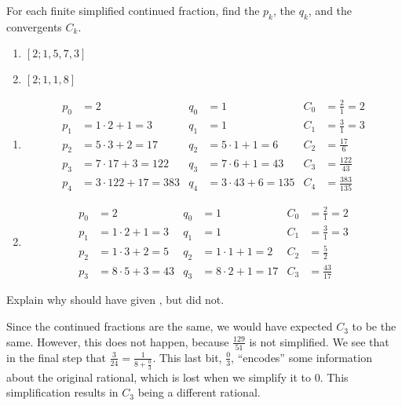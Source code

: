 \documentclass{article}
\newcommand{\quotewrap}[1]{“#1”}
\begin{document}
\begin{problem}{}{}
    \color{CtpText}
    For each finite simplified continued fraction, find the $p_k$, the $q_k$, and the convergents $C_k$.
    \begin{enumerate}[label=\textbf{\arabic*}.]
        \item $[2;1,5,7,3]$
        \item $[2;1,1,8]$
    \end{enumerate}
\end{problem}
\begin{solution}{}{}
    \color{CtpText}
    \begin{enumerate}[label=\textbf{\arabic*}.]
        \item
        \begin{align*}
        p_0&=2 & q_0&=1 & C_0&=\frac{2}{1}=2 \\
        p_1&=1\cdot2+1=3 & q_1&=1 & C_1&=\frac{3}{1}=3 \\
        p_2&=5\cdot3+2=17 & q_2&=5\cdot1+1=6 & C_2&=\frac{17}{6}\\
        p_3&=7\cdot17+3=122 & q_3&=7\cdot6+1=43 & C_3&=\frac{122}{43} \\
        p_4&=3\cdot122+17=383 & q_4&=3\cdot43+6=135 & C_4&=\frac{383}{135}
        \end{align*}
        \item
        \begin{align*}
            p_0&=2 & q_0&=1 & C_0&=\frac{2}{1}=2 \\
            p_1&=1\cdot2+1=3 & q_1&=1 & C_1&=\frac{3}{1}=3 \\
            p_2&=1\cdot3+2=5 & q_2&=1\cdot1+1=2 & C_2&=\frac{5}{2} \\
            p_3&=8\cdot5+3=43 & q_3&=8\cdot2+1=17 & C_3&=\frac{43}{17}
        \end{align*}
    \end{enumerate}
\end{solution}

\begin{problem}{}{}
    \color{CtpText}
    Explain why  should have given , but did not.
\end{problem}
\begin{solution}{}{}
    \color{CtpText}
    Since the continued fractions are the same, we would have expected $C_3$ to be the same. However, this does not happen, because $\frac{129}{51}$ is not simplified. We see that in the final step that $\frac{3}{24}=\frac{1}{8+\frac{0}{3}}$. This last bit, $\frac{0}{3}$, \quotewrap{encodes} some information about the original rational, which is lost when we simplify it to 0. This simplification results in $C_3$ being a different rational.
\end{solution}
\end{document}
